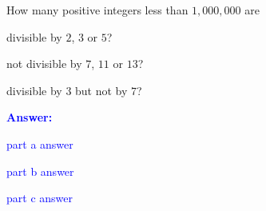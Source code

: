\item{}
How many positive integers less than $1,000,000$ are
\begin{list}{\textbf{.}}{}
\item divisible by $2$, $3$ or $5$?
\item not divisible by $7$, $11$ or $13$?
\item divisible by $3$ but not by $7$?
\end{list}
\vskip12pt
\ifanswers
\textcolor{blue}{
\textbf{Answer:}\\[6pt]
\begin{list}{\textbf{.}}{}
\item part a answer
\item part b answer
\item part c answer
\end{list}
}
\newpage
\fi
